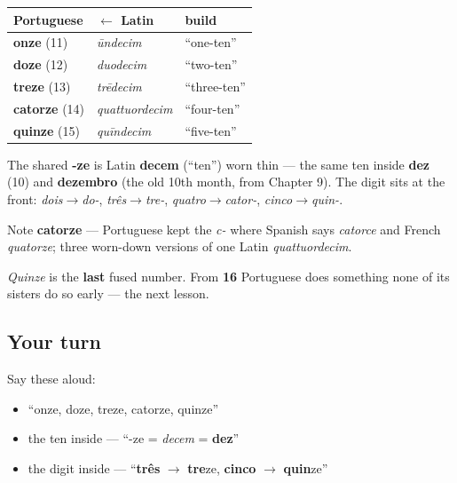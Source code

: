 \begin{grammarlens}[title={Grammar Lens: The five fusions}]
\noindent
\begin{tabularx}{\linewidth}{@{}>{\raggedright\arraybackslash}X>{\raggedright\arraybackslash}X>{\raggedright\arraybackslash}X@{}}
\toprule
\textbf{Portuguese} & \textbf{$\leftarrow$ Latin} & \textbf{build} \\
\midrule
\textbf{onze} (11) & \emph{ūndecim} & \textquotedblleft{}one-ten\textquotedblright{} \\
\textbf{doze} (12) & \emph{duodecim} & \textquotedblleft{}two-ten\textquotedblright{} \\
\textbf{treze} (13) & \emph{trēdecim} & \textquotedblleft{}three-ten\textquotedblright{} \\
\textbf{catorze} (14) & \emph{quattuordecim} & \textquotedblleft{}four-ten\textquotedblright{} \\
\textbf{quinze} (15) & \emph{quīndecim} & \textquotedblleft{}five-ten\textquotedblright{} \\
\bottomrule
\end{tabularx}

The shared \textbf{-ze} is Latin \textbf{decem} (\textquotedblleft{}ten\textquotedblright{}) worn thin — the same ten inside \textbf{dez} (10) and \textbf{dezembro} (the old 10th month, from Chapter 9). The digit sits at the front: \emph{dois$\to$do-}, \emph{três$\to$tre-}, \emph{quatro$\to$cator-}, \emph{cinco$\to$quin-}.

Note \textbf{catorze} — Portuguese kept the \emph{c-} where Spanish says \emph{catorce} and French \emph{quatorze}; three worn-down versions of one Latin \emph{quattuordecim}.
\end{grammarlens}

\begin{grammarlens}[title={What you've built: And that's where it stops}]
\emph{Quinze} is the \textbf{last} fused number. From \textbf{16} Portuguese does something none of its sisters do so early — the next lesson.
\end{grammarlens}

\subsection*{Your turn}
Say these aloud:

\begin{itemize}
\raggedright
  \item \textquotedblleft{}onze, doze, treze, catorze, quinze\textquotedblright{}
  \item the ten inside — \textquotedblleft{}-ze = \emph{decem} = \textbf{dez}\textquotedblright{}
  \item the digit inside — \textquotedblleft{}\textbf{três} $\to$ \textbf{tre}ze, \textbf{cinco} $\to$ \textbf{quin}ze\textquotedblright{}
\end{itemize}

